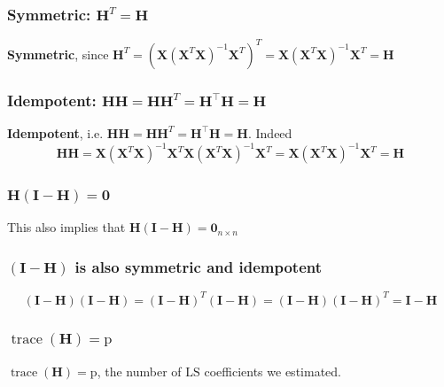 \documentclass[11pt,a4paper]{article}
\begin{document}
\subsubsection{Symmetric: $\mathbf{H}^{T}=\mathbf{H}$}
\textbf{Symmetric}, since $\mathbf{H}^{T}=\left(\mathbf{X}\left(\mathbf{X}^{T} \mathbf{X}\right)^{-1} \mathbf{X}^{T}\right)^{T}=\mathbf{X}\left(\mathbf{X}^{T} \mathbf{X}\right)^{-1} \mathbf{X}^{T}=\mathbf{H}$
\subsubsection{Idempotent: $\mathbf{H H}=\mathbf{H H}^{T}=\mathbf{H}^{\top} \mathbf{H}=\mathbf{H}$}
\textbf{Idempotent}, i.e. $\mathbf{H H}=\mathbf{H H}^{T}=\mathbf{H}^{\top} \mathbf{H}=\mathbf{H} .$ Indeed
$$
\mathbf{H H}=\mathbf{X}\left(\mathbf{X}^{T} \mathbf{X}\right)^{-1} \mathbf{X}^{T} \mathbf{X}\left(\mathbf{X}^{T} \mathbf{X}\right)^{-1} \mathbf{X}^{T}=\mathbf{X}\left(\mathbf{X}^{T} \mathbf{X}\right)^{-1} \mathbf{X}^{T}=\mathbf{H}
$$
\subsubsection{$\mathbf{H}(\mathbf{I}-\mathbf{H})=\mathbf{0}$}
This also implies that $\mathbf{H}(\mathbf{I}-\mathbf{H})=\mathbf{0}_{n \times n}$
\subsubsection{$(\mathbf{I}-\mathbf{H})$ is also symmetric and idempotent}
$$(\mathbf{I}-\mathbf{H})(\mathbf{I}-\mathbf{H})=(\mathbf{I}-\mathbf{H})^T(\mathbf{I}-\mathbf{H})=(\mathbf{I}-\mathbf{H})(\mathbf{I}-\mathbf{H})^T=\mathbf{I}-\mathbf{H}$$
\subsubsection{$\operatorname{trace}(\mathbf{H})=\mathrm{p}$}
$\operatorname{trace}(\mathbf{H})=\mathrm{p}$, the number of $\mathrm{LS}$ coefficients we estimated.
\end{document}
